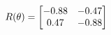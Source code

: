 \documentclass[preview]{standalone}
\begin{document}
\begin{align*}
\special{dvisvgm:raw <g id='unique000'>}R(\theta) = \begin{bmatrix}-0.88 & -0.47\\0.47 & -0.88\end{bmatrix}\special{dvisvgm:raw </g>}
\end{align*}
\end{document}
